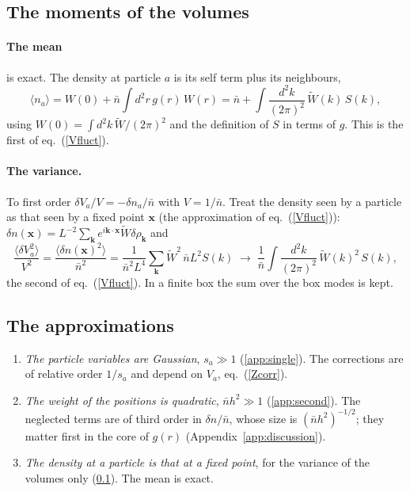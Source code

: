 \documentclass[11pt,aps,preprint,nofootinbib,superscriptaddress,tightenlines]{revtex4-2}
\newcommand{\avg}[1]{\langle #1\rangle}
\def\st{\begin{equation}}
\def\stp{\end{equation}}
\def\Eq#1{eq.~(\ref{#1})}
\def\App#1{Appendix~\ref{#1}}
\let\oldparagraph\paragraph
\renewcommand{\paragraph}{\par\bigskip\oldparagraph}
\begin{document}
\subsection{The moments of the volumes}
\label{app:moments}

\paragraph{The mean} is exact.  The density at particle $a$ is its self term plus its neighbours,
\st
\avg{n_a}=W(0)+\bar n\int d^2r\,g(r)\,W(r)=\bar n+\int\frac{d^2k}{(2\pi)^2}\,\widetilde W(k)\,S(k),
\stp
using $W(0)=\int d^2k\,\widetilde W/(2\pi)^2$ and the definition of $S$ in terms of $g$.  This is the first of \Eq{Vfluct}.

\paragraph{The variance.}  To first order $\delta V_a/V=-\delta n_a/\bar n$ with $V=1/\bar n$.  Treat the density seen by a particle as that seen
by a fixed point $\bm x$ (the approximation of \Eq{Vfluct}): $\delta n(\bm x)=L^{-2}\sum_{\bm k}e^{i\bm k\cdot\bm x}\widetilde W\delta\rho_{\bm k}$ and
\st
\frac{\avg{\delta V_a^2}}{V^2}=\frac{\avg{\delta n(\bm x)^2}}{\bar n^2}=\frac{1}{\bar n^2L^4}\sum_{\bm k}\widetilde W^2\,\bar nL^2S(k)
\;\to\;\frac1{\bar n}\int\frac{d^2k}{(2\pi)^2}\,\widetilde W(k)^2\,S(k),
\stp
the second of \Eq{Vfluct}.  In a finite box the sum over the box modes is kept.

\subsection{The approximations}
\label{app:valid}

\begin{enumerate}
\item \emph{The particle variables are Gaussian}, $s_a\gg1$ (\ref{app:single}).  The corrections are of relative order $1/s_a$ and depend on $V_a$,
  \Eq{Zcorr}.
\item \emph{The weight of the positions is quadratic}, $\bar nh^2\gg1$ (\ref{app:second}).  The neglected terms are of third order in $\delta n/\bar n$,
  whose size is $(\bar nh^2)^{-1/2}$; they matter first in the core of $g(r)$ (\App{app:discussion}).
\item \emph{The density at a particle is that at a fixed point}, for the variance of the volumes only (\ref{app:moments}).  The mean is exact.
\end{enumerate}
\end{document}
